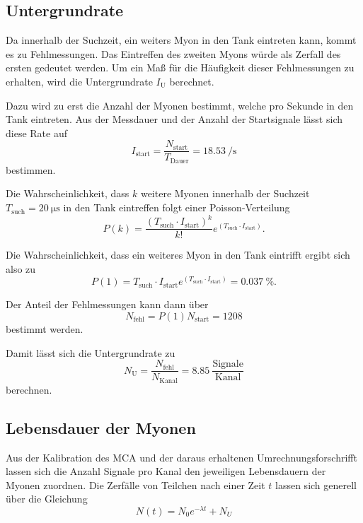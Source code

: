\subsection{Untergrundrate}

Da innerhalb der Suchzeit, ein weiters Myon in den Tank eintreten kann, kommt es zu Fehlmessungen. Das Eintreffen des zweiten Myons würde als Zerfall des ersten gedeutet werden.  Um ein Maß für die Häufigkeit dieser Fehlmessungen zu erhalten, wird die Untergrundrate $I_\text{U}$ berechnet.


Dazu wird zu erst die Anzahl der Myonen bestimmt, welche pro Sekunde in den Tank eintreten. 
Aus der Messdauer und der Anzahl der Startsignale lässt sich diese Rate auf
\begin{equation}
    I_\text{start} = \frac{N_\text{start}}{T_\text{Dauer}} = \SI{18.53}{\per\s}
\end{equation}
bestimmen.

Die Wahrscheinlichkeit, dass $k$ weitere Myonen innerhalb der Suchzeit $T_\text{such} = \SI{20}{\micro\s}$ in den Tank eintreffen folgt einer Poisson-Verteilung 
\begin{equation}
    P(k) = \frac{(T_\text{such} \cdot I_\text{start})^k}{k!} e^{(T_\text{such} \cdot I_\text{start})} .
\end{equation}

Die Wahrscheinlichkeit, dass ein weiteres Myon in den Tank eintrifft ergibt sich also zu 
\begin{equation}
    P(1) = T_\text{such}\cdot I_\text{start} e^{(T_\text{such} \cdot I_\text{start})} = \SI{0.037}{\percent} .
\end{equation}

Der Anteil der Fehlmessungen kann dann über 
\begin{equation}
    N_\text{fehl} = P(1)N_\text{start} = \num{1208}
\end{equation}
bestimmt werden.

Damit lässt sich die Untergrundrate zu 
\begin{equation}
    N_\text{U} = \frac{N_\text{fehl}}{N_\text{Kanal}} = \num{8.85} \: \frac{\text{Signale}}{\text{Kanal}}
\end{equation}
berechnen.

\subsection{Lebensdauer der Myonen}

Aus der Kalibration des MCA und der daraus erhaltenen Umrechnungsforschrifft lassen sich die Anzahl Signale pro Kanal den jeweiligen Lebensdauern der Myonen zuordnen. Die Zerfälle von Teilchen nach einer Zeit $t$ lassen sich generell über die Gleichung
\begin{equation}
    N(t) = N_0 e^{-\lambda t} + N_U
\end{equation}

